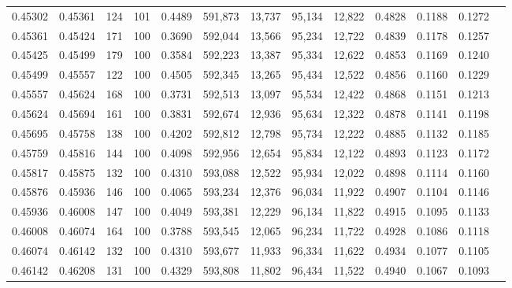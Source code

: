 \begin{tabular}{rrrrrrrrrrrrr}
0.45302 & 0.45361 &   124 & 101 &                                     0.4489 & 591,873 &  13,737 &  95,134 &  12,822 & 0.4828 & 0.1188 & 0.1272 \\
0.45361 & 0.45424 &   171 & 100 &                                     0.3690 & 592,044 &  13,566 &  95,234 &  12,722 & 0.4839 & 0.1178 & 0.1257 \\
0.45425 & 0.45499 &   179 & 100 &                                     0.3584 & 592,223 &  13,387 &  95,334 &  12,622 & 0.4853 & 0.1169 & 0.1240 \\
0.45499 & 0.45557 &   122 & 100 &                                     0.4505 & 592,345 &  13,265 &  95,434 &  12,522 & 0.4856 & 0.1160 & 0.1229 \\
0.45557 & 0.45624 &   168 & 100 &                                     0.3731 & 592,513 &  13,097 &  95,534 &  12,422 & 0.4868 & 0.1151 & 0.1213 \\
0.45624 & 0.45694 &   161 & 100 &                                     0.3831 & 592,674 &  12,936 &  95,634 &  12,322 & 0.4878 & 0.1141 & 0.1198 \\
0.45695 & 0.45758 &   138 & 100 &                                     0.4202 & 592,812 &  12,798 &  95,734 &  12,222 & 0.4885 & 0.1132 & 0.1185 \\
0.45759 & 0.45816 &   144 & 100 &                                     0.4098 & 592,956 &  12,654 &  95,834 &  12,122 & 0.4893 & 0.1123 & 0.1172 \\
0.45817 & 0.45875 &   132 & 100 &                                     0.4310 & 593,088 &  12,522 &  95,934 &  12,022 & 0.4898 & 0.1114 & 0.1160 \\
0.45876 & 0.45936 &   146 & 100 &                                     0.4065 & 593,234 &  12,376 &  96,034 &  11,922 & 0.4907 & 0.1104 & 0.1146 \\
0.45936 & 0.46008 &   147 & 100 &                                     0.4049 & 593,381 &  12,229 &  96,134 &  11,822 & 0.4915 & 0.1095 & 0.1133 \\
0.46008 & 0.46074 &   164 & 100 &                                     0.3788 & 593,545 &  12,065 &  96,234 &  11,722 & 0.4928 & 0.1086 & 0.1118 \\
0.46074 & 0.46142 &   132 & 100 &                                     0.4310 & 593,677 &  11,933 &  96,334 &  11,622 & 0.4934 & 0.1077 & 0.1105 \\
0.46142 & 0.46208 &   131 & 100 &                                     0.4329 & 593,808 &  11,802 &  96,434 &  11,522 & 0.4940 & 0.1067 & 0.1093 \\

\end{tabular}
